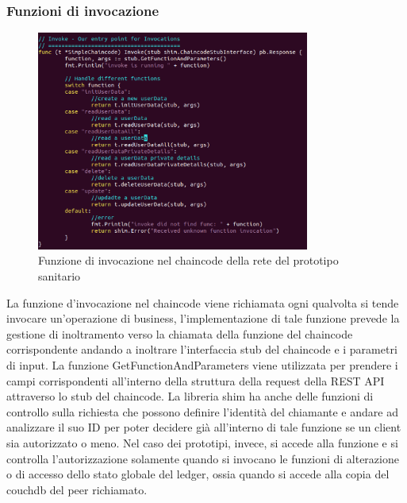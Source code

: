 \newpage
\newpage
\subsubsection{Funzioni di invocazione}
\begin{figure}[h]
    \centering
    \includegraphics[width=0.8\textwidth]{img/invoke-chaincode.png}
    \caption{Funzione di invocazione nel chaincode della rete del prototipo sanitario}
    \label{fig:invoke-chaincode}
\end{figure}
La funzione d'invocazione nel chaincode viene richiamata ogni qualvolta si tende invocare un'operazione di business, l'implementazione di tale funzione prevede la gestione di inoltramento verso la chiamata della funzione del chaincode corrispondente andando a inoltrare l'interfaccia stub del chaincode e i parametri di input. La funzione GetFunctionAndParameters viene utilizzata per prendere i campi corrispondenti all'interno della struttura della request della REST API attraverso lo stub del chaincode. La libreria shim ha anche delle funzioni di controllo sulla richiesta che possono definire l'identità del chiamante e andare ad analizzare il suo ID per poter decidere già all'interno di tale funzione se un client sia autorizzato o meno. Nel caso dei prototipi, invece, si accede alla funzione e si controlla l'autorizzazione solamente quando si invocano le funzioni di alterazione o di accesso dello stato globale del ledger, ossia quando si accede alla copia del couchdb del peer richiamato.
\newpage
